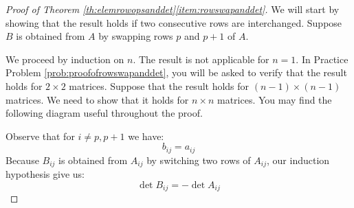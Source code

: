 \documentclass{ximera}
\begin{document}
\begin{proof}[Proof of Theorem \ref{th:elemrowopsanddet}\ref{item:rowswapanddet}] We will start by showing that the result holds if two consecutive rows are interchanged.  Suppose $B$ is obtained from $A$ by swapping rows $p$ and $p+1$ of $A$. 

We proceed by induction on $n$.  The result is not applicable for $n=1$.  In Practice Problem \ref{prob:proofofrowswapanddet}, you will be asked to verify that the result holds for $2\times 2$ matrices.  Suppose that the result holds for $(n-1)\times (n-1)$ matrices.  We need to show that it holds for $n\times n$ matrices.
You may find the following diagram useful throughout the proof.
\begin{center}
 \end{center} 
 Observe that for $i\neq p, p+1$ we have: $$b_{ij}=a_{ij}$$ Because $B_{ij}$ is obtained from $A_{ij}$ by switching two rows of $A_{ij}$, our induction hypothesis give us:
 $$\det{B_{ij}}=-\det{A_{ij}}$$
 

\end{proof}
\end{document}
